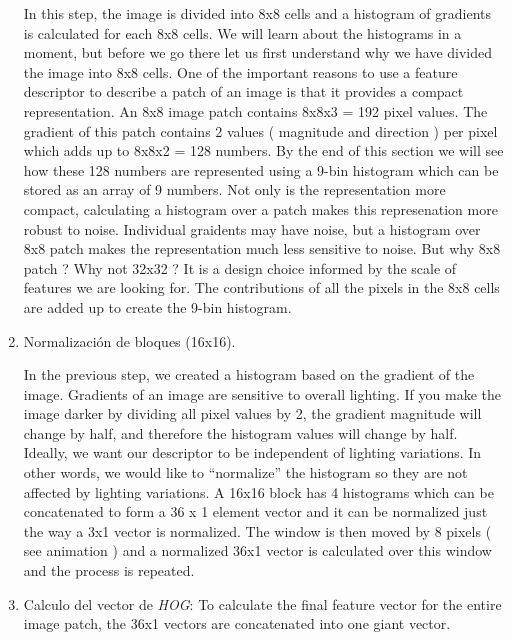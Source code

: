 \begin{enumerate}
	In this step, the image is divided into 8x8 cells and a histogram of gradients is calculated for each 8x8 cells.
	We will learn about the histograms in a moment, but before we go there let us first understand why we have divided the image into 8x8 cells. One of the important reasons to use a feature descriptor to describe a patch of an image is that it provides a compact representation. An 8x8 image patch contains 8x8x3 = 192 pixel values. The gradient of this patch contains 2 values ( magnitude and direction ) per pixel which adds up to 8x8x2 = 128 numbers.
	By the end of this section we will see how these 128 numbers are represented using a 9-bin histogram which can be stored as an array of 9 numbers. Not only is the representation more compact, calculating a histogram over a patch makes this represenation more robust to noise. Individual graidents may have noise, but a histogram over 8x8 patch makes the representation much less sensitive to noise.
	But why 8x8 patch ? Why not 32x32 ? It is a design choice informed by the scale of features we are looking for. 
	The contributions of all the pixels in the 8x8 cells are added up to create the 9-bin histogram.
	
	\item Normalización de bloques (16x16).
	
	In the previous step, we created a histogram based on the gradient of the image. Gradients of an image are sensitive to overall lighting. If you make the image darker by dividing all pixel values by 2, the gradient magnitude will change by half, and therefore the histogram values will change by half.
	Ideally, we want our descriptor to be independent of lighting variations. In other words, we would like to “normalize” the histogram so they are not affected by lighting variations.
	A 16x16 block has 4 histograms which can be concatenated to form a 36 x 1 element vector and it can be normalized just the way a 3x1 vector is normalized. The window is then moved by 8 pixels ( see animation ) and a normalized 36x1 vector is calculated over this window and the process is repeated.
	
	\item Calculo del vector de \textit{HOG}: To calculate the final feature vector for the entire image patch, the 36x1 vectors are concatenated into one giant vector.


\end{enumerate}



